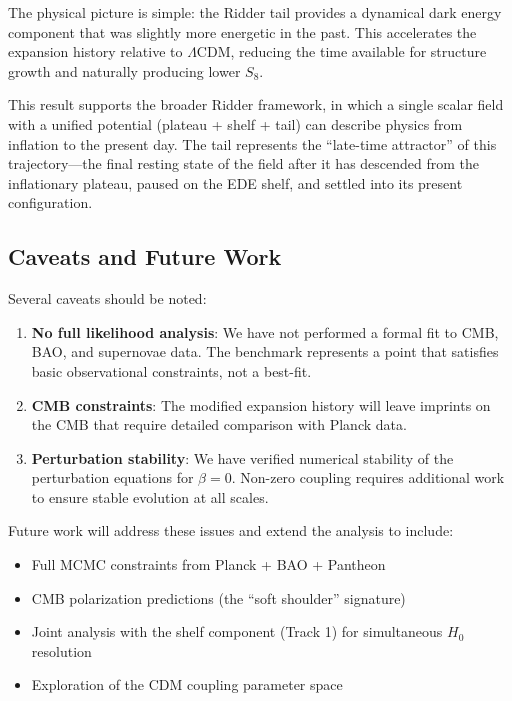The physical picture is simple: the Ridder tail provides a dynamical dark energy component that was slightly more energetic in the past. This accelerates the expansion history relative to $\Lambda$CDM, reducing the time available for structure growth and naturally producing lower $S_8$.

This result supports the broader Ridder framework, in which a single scalar field with a unified potential (plateau + shelf + tail) can describe physics from inflation to the present day. The tail represents the ``late-time attractor'' of this trajectory---the final resting state of the field after it has descended from the inflationary plateau, paused on the EDE shelf, and settled into its present configuration.

\subsection{Caveats and Future Work}

Several caveats should be noted:

\begin{enumerate}
    \item \textbf{No full likelihood analysis}: We have not performed a formal fit to CMB, BAO, and supernovae data. The benchmark represents a point that satisfies basic observational constraints, not a best-fit.
    
    \item \textbf{CMB constraints}: The modified expansion history will leave imprints on the CMB that require detailed comparison with Planck data.
    
    \item \textbf{Perturbation stability}: We have verified numerical stability of the perturbation equations for $\beta = 0$. Non-zero coupling requires additional work to ensure stable evolution at all scales.
\end{enumerate}

Future work will address these issues and extend the analysis to include:
\begin{itemize}
    \item Full MCMC constraints from Planck + BAO + Pantheon
    \item CMB polarization predictions (the ``soft shoulder'' signature)
    \item Joint analysis with the shelf component (Track 1) for simultaneous $H_0$ resolution
    \item Exploration of the CDM coupling parameter space
\end{itemize}

